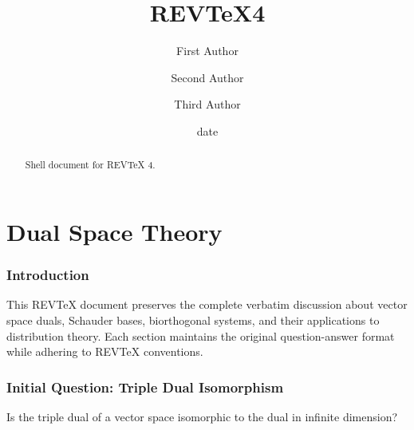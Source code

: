 \documentclass[aps,preprint]{revtex4}
\newenvironment{question}
  {\begin{tcolorbox}[colback=blue!5!white,colframe=blue!75!black,title=Question]}
  {\end{tcolorbox}}
\begin{document}
\title[Short title for running header]{REV\TeX4}
\author{First Author}
\author{Second Author}
\author{Third Author}

\begin{abstract}
Shell document for REV\TeX{} 4.
\end{abstract}

\date[Date text]{date}
\maketitle
\tableofcontents

\part{Dual Space Theory}

\section{Introduction}

This REVTeX document preserves the complete verbatim discussion about vector
space duals, Schauder bases, biorthogonal systems, and their applications to
distribution theory. Each section maintains the original question-answer
format while adhering to REVTeX conventions.

\section{Initial Question: Triple Dual Isomorphism}

\begin{question}
Is the triple dual of a vector space isomorphic to the dual in infinite
dimension?
\end{question}
\end{document}
